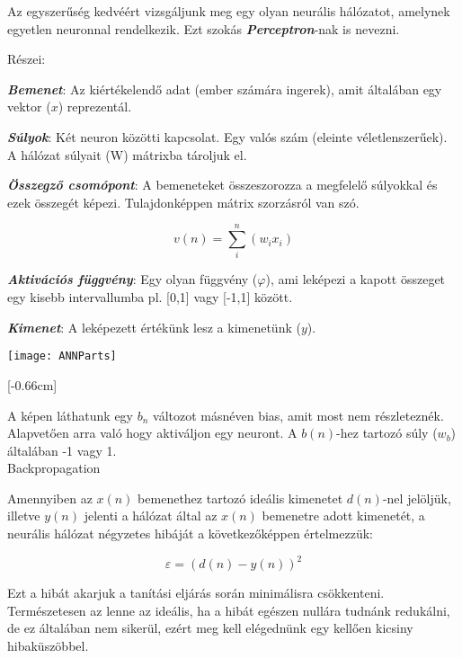 Az egyszerűség kedvéért vizsgáljunk meg egy olyan neurális hálózatot, amelynek egyetlen neuronnal rendelkezik. Ezt szokás \textbf{\textit{Perceptron}}-nak is nevezni. 

Részei: 

\textbf{\textit{Bemenet}}: Az kiértékelendő adat (ember számára ingerek), amit általában egy vektor (\(x\)) reprezentál. 

\textit{\textbf{Súlyok}}: Két neuron közötti kapcsolat. Egy valós szám (eleinte véletlenszerűek). A hálózat súlyait (W) mátrixba tároljuk el.  

\textbf{\textit{Összegző csomópont}}: A bemeneteket összeszorozza a megfelelő súlyokkal és ezek összegét képezi. Tulajdonképpen mátrix szorzásról van szó.  

\[v(n) = \sum_i^{n}(w_ix_i)\]

\textit{\textbf{Aktivációs függvény}}: Egy olyan függvény ($\varphi$), ami leképezi a kapott összeget egy kisebb intervallumba pl. [0,1] vagy [-1,1] között. 

\textbf{\textit{Kimenet}}: A leképezett értékünk lesz a kimenetünk (\(y\)). 

\begin{center}
	\texttt{[image: ANNParts]}
\end{center}

[-0.66cm]

A képen láthatunk egy \(b_n\) változot másnéven bias, amit most nem részleteznék. Alapvetően arra való hogy aktiváljon egy neuront. A \(b(n)\)-hez tartozó súly (\(w_b\)) általában -1 vagy 1.\\


{\Large Backpropagation}

Amennyiben az \(x(n)\) bemenethez tartozó ideális kimenetet \(d(n)\)-nel jelöljük, illetve \(y(n)\) jelenti a hálózat által az \(x(n)\) bemenetre adott kimenetét, a neurális hálózat négyzetes hibáját a következőképpen értelmezzük: 

\[ \varepsilon = (d(n) - y(n))^2\]

Ezt a hibát akarjuk a tanítási eljárás során minimálisra csökkenteni. Természetesen az lenne az ideális, ha a hibát egészen nullára tudnánk redukálni, de ez általában nem sikerül, ezért meg kell elégednünk egy kellően kicsiny hibaküszöbbel. 